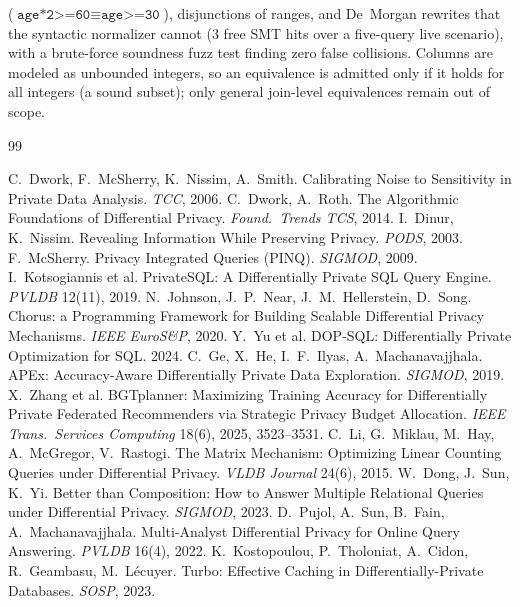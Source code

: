 \documentclass[sigconf,nonacm]{acmart}
\begin{document}
($\texttt{age*2>=60}\equiv\texttt{age>=30}$), disjunctions of ranges, and De~Morgan rewrites that the syntactic normalizer cannot ($3$ free SMT hits over a five-query live scenario), with a brute-force soundness fuzz test finding zero false collisions. Columns are modeled as unbounded integers, so an equivalence is admitted only if it holds for all integers (a sound subset); only general join-level equivalences remain out of scope.
\begin{thebibliography}{99}\footnotesize

 C.\ Dwork, F.\ McSherry, K.\ Nissim, A.\ Smith. Calibrating Noise to Sensitivity in Private Data Analysis. \emph{TCC}, 2006.
 C.\ Dwork, A.\ Roth. The Algorithmic Foundations of Differential Privacy. \emph{Found.\ Trends TCS}, 2014.
 I.\ Dinur, K.\ Nissim. Revealing Information While Preserving Privacy. \emph{PODS}, 2003.
 F.\ McSherry. Privacy Integrated Queries (PINQ). \emph{SIGMOD}, 2009.
 I.\ Kotsogiannis et al. PrivateSQL: A Differentially Private SQL Query Engine. \emph{PVLDB} 12(11), 2019.
 N.\ Johnson, J.\ P.\ Near, J.\ M.\ Hellerstein, D.\ Song. Chorus: a Programming Framework for Building Scalable Differential Privacy Mechanisms. \emph{IEEE EuroS\&P}, 2020.
 Y.\ Yu et al. DOP-SQL: Differentially Private Optimization for SQL. 2024.
 C.\ Ge, X.\ He, I.\ F.\ Ilyas, A.\ Machanavajjhala. APEx: Accuracy-Aware Differentially Private Data Exploration. \emph{SIGMOD}, 2019.
 X.\ Zhang et al. BGTplanner: Maximizing Training Accuracy for Differentially Private Federated Recommenders via Strategic Privacy Budget Allocation. \emph{IEEE Trans.\ Services Computing} 18(6), 2025, 3523--3531.
 C.\ Li, G.\ Miklau, M.\ Hay, A.\ McGregor, V.\ Rastogi. The Matrix Mechanism: Optimizing Linear Counting Queries under Differential Privacy. \emph{VLDB Journal} 24(6), 2015.
 W.\ Dong, J.\ Sun, K.\ Yi. Better than Composition: How to Answer Multiple Relational Queries under Differential Privacy. \emph{SIGMOD}, 2023.
 D.\ Pujol, A.\ Sun, B.\ Fain, A.\ Machanavajjhala. Multi-Analyst Differential Privacy for Online Query Answering. \emph{PVLDB} 16(4), 2022.
 K.\ Kostopoulou, P.\ Tholoniat, A.\ Cidon, R.\ Geambasu, M.\ L\'ecuyer. Turbo: Effective Caching in Differentially-Private Databases. \emph{SOSP}, 2023.

\end{thebibliography}
\end{document}
